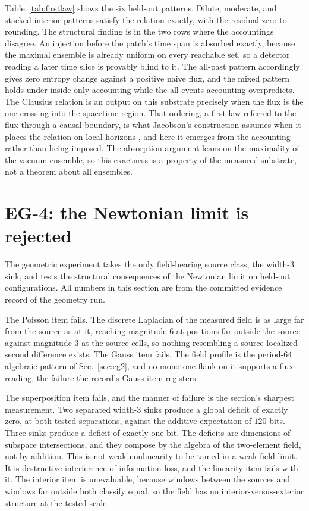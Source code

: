 \documentclass[aps,pre,reprint,nofootinbib]{revtex4-2}
\begin{document}
Table~\ref{tab:firstlaw} shows the six held-out patterns.  Dilute,
moderate, and stacked interior patterns satisfy the relation exactly,
with the residual zero to rounding.  The structural finding is in the
two rows where the accountings disagree.  An injection before the
patch's time span is absorbed exactly, because the maximal ensemble
is already uniform on every reachable set, so a detector reading a
later time slice is provably blind to it.  The all-past pattern
accordingly gives zero entropy change against a positive naive flux,
and the mixed pattern holds under inside-only accounting while the
all-events accounting overpredicts.  The Clausius relation is an
output on this substrate precisely when the flux is the one crossing
into the spacetime region.  That ordering, a first law referred to
the flux through a causal boundary, is what Jacobson's construction
assumes when it places the relation on local horizons
\cite{Jacobson1995}, and here it emerges from the accounting rather
than being imposed.  The
absorption argument leans on the maximality of the vacuum ensemble,
so this exactness is a property of the measured substrate, not a
theorem about all ensembles.

\section{EG-4: the Newtonian limit is rejected}
\label{sec:eg4}

The geometric experiment takes the only field-bearing source class,
the width-$3$ sink, and tests the structural consequences of the
Newtonian limit on held-out configurations.  All numbers in this
section are from the committed evidence record of the geometry run.

The Poisson item fails.  The discrete Laplacian of the measured field
is as large far from the source as at it, reaching magnitude $6$ at
positions far outside the source against magnitude $3$ at the source
cells, so nothing resembling a source-localized second difference
exists.  The Gauss item fails.  The field profile is the period-$64$
algebraic pattern of Sec.~\ref{sec:eg2}, and no monotone flank on it
supports a flux reading, the failure the record's Gauss item
registers.

The superposition item fails, and the manner of failure is the
section's sharpest measurement.  Two separated width-$3$ sinks
produce a global deficit of exactly zero, at both tested separations,
against the additive expectation of $120$ bits.  Three sinks produce
a deficit of exactly one bit.  The deficits are dimensions of
subspace intersections, and they compose by the algebra of the
two-element field, not by addition.  This is not weak nonlinearity to
be tamed in a weak-field limit.  It is destructive interference of
information loss, and the linearity item fails with it.  The interior
item is unevaluable, because windows between the sources and windows
far outside both classify equal, so the field has no
interior-versus-exterior structure at the tested scale.
\end{document}
